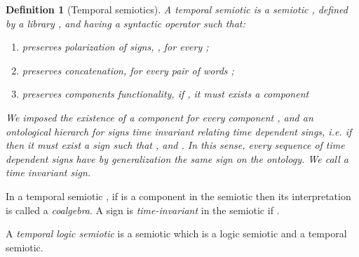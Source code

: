 \documentclass[oribibl]{llncs}
\newtheorem{defn}{Definition}
\begin{document}
\begin{defn}[Temporal semiotics]
A \emph{temporal semiotic} is a semiotic , defined by a library , and having a syntactic operator  such that:
\begin{enumerate}
  \item preserves polarization of signs, , for every ;
  \item preserves concatenation,  for every pair of words ;
  \item preserves components functionality, if , it must exists a component 
\end{enumerate}
We imposed the existence of a component  for every component , and an ontological hierarch for signs time invariant relating time dependent sings, i.e. if  then it must exist a sign  such that ,  and . In this sense, every sequence of time dependent signs   have by generalization the same sign  on the ontology. We call  a \emph{time invariant sign}.
\end{defn}

In a temporal semiotic , if  is a component in the semiotic then its interpretation  is called a \emph{coalgebra}. A sign  is \emph{time-invariant} in the semiotic if .

A \emph{temporal logic semiotic} is a semiotic which is a logic semiotic and a temporal semiotic.
\end{document}

